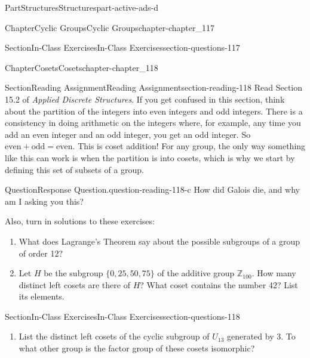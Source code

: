 \documentclass[oneside,10pt,]{book}
\numberwithin{equation}{section}
\begin{document}
\begin{partptx}{Part}{Structures}{}{Structures}{}{}{part-active-ads-d}
\begin{chapterptx}{Chapter}{Cyclic Groups}{}{Cyclic Groups}{}{}{chapter-chapter_117}
\begin{sectionptx}{Section}{In-Class Exercises}{}{In-Class Exercises}{}{}{section-questions-117}
\begin{enumerate}[label=\arabic*.]
\end{enumerate}
%
\end{sectionptx}
\end{chapterptx}
%
\typeout{************************************************}
\typeout{************************************************}
%
\begin{chapterptx}{Chapter}{Cosets}{}{Cosets}{}{}{chapter-chapter_118}
\renewcommand*{\chaptername}{Chapter}
\index{}%
%
%
\typeout{************************************************}
\typeout{************************************************}
%
\begin{sectionptx}{Section}{Reading Assignment}{}{Reading Assignment}{}{}{section-reading-118}
Read Section 15.2 of \emph{Applied Discrete Structures}. If you get confused in this section, think about the partition of the integers into even integers and odd integers.  There is a consistency in doing arithmetic on the integers where, for example, any time you add an even integer and an odd integer, you get an odd integer.  So \(\textrm{even} + \textrm{odd} = \textrm{even}\).  This is coset addition!  For any group, the only way something like this can work is when the partition is into cosets, which is why we start by defining this set of subsets of a group.%
\begin{question}{Question}{Response Question.}{question-reading-118-c}%
How did Galois die, and why am I asking you this?%
\end{question}
Also, turn in solutions to these exercises:%
\begin{enumerate}[label=\arabic*.]
\item{}What does Lagrange's Theorem say about the possible subgroups of a group of order 12?%
\item{}Let \(H\) be the subgroup \(\{0,25,50,75\}\) of the additive group \(\mathbb{Z}_{100}\). How many distinct left cosets are there of \(H\)?  What coset contains the number 42? List its elements.%
\end{enumerate}
%
\end{sectionptx}
%
%
\typeout{************************************************}
\typeout{************************************************}
%
\begin{sectionptx}{Section}{In-Class Exercises}{}{In-Class Exercises}{}{}{section-questions-118}
%
\begin{enumerate}[label=\arabic*.]
\item{}List the distinct left cosets of the cyclic subgroup of \(U_{13}\) generated by 3. To what other group is the factor group of these cosets isomorphic?%

\end{enumerate}
\end{sectionptx}
\end{chapterptx}
\end{partptx}
\end{document}
